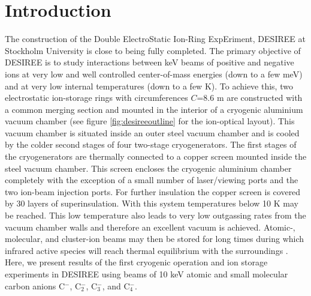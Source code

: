 \documentclass[aps,pra,preprint,superscriptaddress]{revtex4}
\begin{document}
\pacs{}

\maketitle
\section{Introduction}
The construction of the Double ElectroStatic Ion-Ring ExpEriment, DESIREE \cite{Tho11, Sch08Desiree} at Stockholm University is close to being fully completed. The primary objective of DESIREE is to study interactions between keV beams of positive and negative ions at very low and well controlled center-of-mass energies (down to a few meV) and at very low internal temperatures (down to a few K). To achieve this, two electrostatic ion-storage rings with circumferences $C$=8.6 m are constructed with a common merging section and mounted in the interior of a cryogenic aluminium vacuum chamber (see figure \ref{fig:desireeoutline} for the ion-optical layout). This vacuum chamber is situated inside an outer steel vacuum chamber and is cooled by the colder second stages of four two-stage cryogenerators. The first stages of the cryogenerators are thermally connected to a copper screen mounted inside the steel vacuum chamber. This screen encloses the cryogenic aluminium chamber completely with the exception of a small number of laser/viewing ports and the two ion-beam injection ports. For further insulation the copper screen is covered by 30 layers of superinsulation. With this system temperatures below 10 K may be reached. This low temperature also leads to very low outgassing rates from the vacuum chamber walls and therefore an excellent vacuum is achieved. Atomic-, molecular, and cluster-ion beams may then be stored for long times during which infrared active species will reach thermal equilibrium with the surroundings \cite{Tho11}. Here, we present results of the first cryogenic operation and ion storage experiments in DESIREE using beams of 10 keV atomic and small molecular carbon anions C$^-$, C$_2^-$, C$_3^-$, and C$_4^-$.
\end{document}

